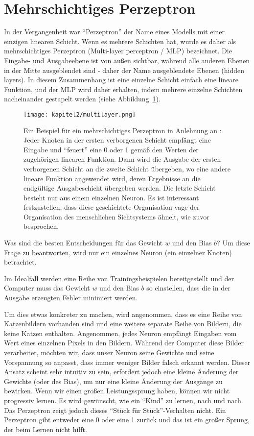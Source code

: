\section{Mehrschichtiges Perzeptron}
In der Vergangenheit war \enquote{Perzeptron} der Name eines Modells mit einer einzigen linearen Schicht. Wenn es mehrere Schichten hat, wurde es daher als mehrschichtiges Perzeptron (Multi-layer perceptron / MLP) bezeichnet. Die Eingabe- und Ausgabeebene  ist von außen sichtbar, während alle anderen Ebenen in der Mitte ausgeblendet sind - daher der Name ausgeblendete Ebenen (hidden layers). In diesem Zusammenhang ist eine einzelne Schicht einfach eine lineare Funktion, und der MLP wird daher erhalten, indem mehrere einzelne Schichten nacheinander gestapelt werden (siehe Abbildung~\ref{Kap2:Multi}).

\begin{figure}[H]
    \centering
    \texttt{[image: kapitel2/multilayer.png]}
    \caption[Das mehrschichtige Perzeptron]{Ein Beispiel für ein mehrschichtiges Perzeptron in Anlehnung an \cite{Taylor2017}: Jeder Knoten in der ersten verborgenen Schicht empfängt eine Eingabe und \enquote{feuert} eine 0 oder 1 gemäß den Werten der zugehörigen linearen Funktion. Dann wird die Ausgabe der ersten verborgenen Schicht an die zweite Schicht übergeben, wo eine andere lineare Funktion angewendet wird, deren Ergebnisse an die endgültige Ausgabeschicht übergeben werden. Die letzte Schicht besteht nur aus einem einzelnen Neuron. Es ist interessant festzustellen, dass diese geschichtete Organisation vage der Organisation des menschlichen Sichtsystems ähnelt, wie zuvor besprochen.}
    \label{Kap2:Multi}
\end{figure}

Was sind die besten Entscheidungen für das Gewicht $w$ und den Bias $b$? Um diese Frage zu beantworten, wird nur ein einzelnes Neuron (ein einzelner Knoten) betrachtet.

Im Idealfall werden eine Reihe von Trainingsbeispielen bereitgestellt und der Computer muss das Gewicht $w$ und den Bias $b$ so einstellen, dass die in der Ausgabe erzeugten Fehler minimiert werden.

Um dies etwas konkreter zu machen, wird angenommen, dass es eine Reihe von Katzenbildern vorhanden sind und eine weitere separate Reihe von Bildern, die keine Katzen enthalten. Angenommen, jedes Neuron empfängt Eingaben vom Wert eines einzelnen Pixels in den Bildern. Während der Computer diese Bilder verarbeitet, möchten wir, dass unser Neuron seine Gewichte und seine Vorspannung so anpasst, dass immer weniger Bilder falsch erkannt werden.
Dieser Ansatz scheint sehr intuitiv zu sein, erfordert jedoch eine kleine Änderung der Gewichte (oder des Bias), um nur eine kleine Änderung der Ausgänge zu bewirken. Wenn wir einen großen Leistungssprung haben, können wir nicht progressiv lernen. Es wird gewünscht, wie ein \enquote{Kind} zu lernen, nach und nach. Das Perzeptron zeigt jedoch dieses \enquote{Stück für Stück}-Verhalten nicht. Ein Perzeptron gibt entweder eine 0 oder eine 1 zurück und das ist ein großer Sprung, der beim Lernen nicht hilft.


